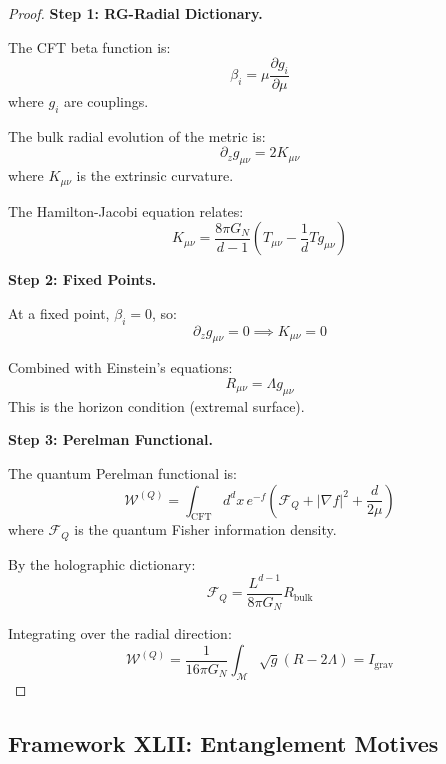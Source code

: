 \documentclass[12pt,a4paper]{article}
\begin{document}
\begin{proof}
\textbf{Step 1: RG-Radial Dictionary.}

The CFT beta function is:
\begin{equation}
\beta_i = \mu \frac{\partial g_i}{\partial \mu}
\end{equation}
where $g_i$ are couplings.

The bulk radial evolution of the metric is:
\begin{equation}
\partial_z g_{\mu\nu} = 2K_{\mu\nu}
\end{equation}
where $K_{\mu\nu}$ is the extrinsic curvature.

The Hamilton-Jacobi equation relates:
\begin{equation}
K_{\mu\nu} = \frac{8\pi G_N}{d-1}\left(T_{\mu\nu} - \frac{1}{d}T g_{\mu\nu}\right)
\end{equation}

\textbf{Step 2: Fixed Points.}

At a fixed point, $\beta_i = 0$, so:
\begin{equation}
\partial_z g_{\mu\nu} = 0 \implies K_{\mu\nu} = 0
\end{equation}

Combined with Einstein's equations:
\begin{equation}
R_{\mu\nu} = \Lambda g_{\mu\nu}
\end{equation}
This is the horizon condition (extremal surface).

\textbf{Step 3: Perelman Functional.}

The quantum Perelman functional is:
\begin{equation}
\mathcal{W}^{(Q)} = \int_{\text{CFT}} d^d x \, e^{-f} \left(\mathcal{F}_Q + |\nabla f|^2 + \frac{d}{2\mu}\right)
\end{equation}
where $\mathcal{F}_Q$ is the quantum Fisher information density.

By the holographic dictionary:
\begin{equation}
\mathcal{F}_Q = \frac{L^{d-1}}{8\pi G_N} R_{\text{bulk}}
\end{equation}

Integrating over the radial direction:
\begin{equation}
\mathcal{W}^{(Q)} = \frac{1}{16\pi G_N} \int_{\mathcal{M}} \sqrt{g}(R - 2\Lambda) = I_{\text{grav}}
\end{equation}
\end{proof}

\subsection{Framework XLII: Entanglement Motives}
\end{document}
